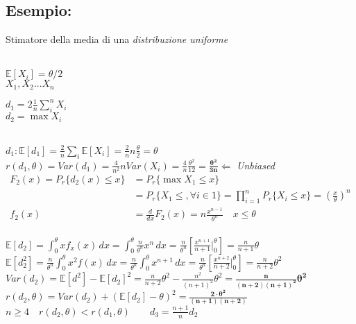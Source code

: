 \documentclass[]{article}
\newcommand{\ev}{\mathbb{E}[X]}
\renewcommand{\ev}[1]{\mathbb{E}[#1]}
\begin{document}
    \subsection{Esempio:} Stimatore della media di una \textit{distribuzione uniforme} \\\\
    \begin{minipage}{0.4\textwidth}
        $\ev{X_i} = \theta / 2$ \\
        $X_1, X_2 \ldots X_n$
    \end{minipage}
    \begin{minipage}{0.4\textwidth}
        $d_1 = 2 \frac{1}{n} \sum_{i}^{n} X_i$ \\
        $d_2 = \max X_i$
    \end{minipage} \\[4ex]
    $d_1 : \ev{d_1} = \frac{2}{n} \sum_{i}^{} \ev{X_i} = \frac{2}{n} n \frac{\theta}{2} = \theta$ \\
    $r(d_1, \theta) = Var(d_1) = \frac{4}{n^2} n Var(X_i) = \frac{4}{n} \frac{\theta^2}{12} = \boldsymbol{\frac{\theta^2}{3n}} \Leftarrow$ \textit{Unbiased} \\[4ex]
    \begin{equation*}
        \begin{split}
            F_2(x) = P_r \{ d_2(x) \leq x \} &= P_r \{ \max X_1 \leq x \} \\
            &= P_r \{ X_1 \leq, \forall i \in 1 \} = \prod_{i = 1}^{n} P_r \{ X_i \leq x \} = (\frac{x}{\theta})^n \\
            f_2(x) &= \frac{d}{dx} F_2(x) = n \frac{x^{n-1}}{\theta^n} \quad x \leq \theta
        \end{split}
    \end{equation*} \\[6ex]
    $\displaystyle \ev{d_2} = \int_{0}^{\theta} x f_x(x) \, dx = \int_{0}^{\theta} \frac{n}{\theta^n} x^n \, dx = \frac{n}{\theta^n} \left[ \frac{x^{n+1}}{n+1} \bigg\rvert_{0}^{\theta}\right] = \frac{n}{n+1} \theta$ \\[2ex]
    $\displaystyle \ev{d_2^2} = \frac{n}{\theta^n} \int_{0}^{\theta} x^2 f(x) \, dx = \frac{n}{\theta^n} \int_{0}^{\theta} x^{n+1} \, dx = \frac{n}{\theta^n} \left[ \frac{x^{n+2}}{n+2} \bigg\rvert_{0}^{\theta}\right] = \frac{n}{n+2} \theta^2$ \\[2ex]
    $Var(d_2) = \ev{d^2} - \ev{d_2}^2 = \frac{n}{n+2}\theta^2 - \frac{n^2}{(n+1)^2} \theta^2 = \boldsymbol{\frac{n}{(n+2)(n+1)^2} \theta^2}$ \\[4ex]
    $r(d_2, \theta) = Var(d_2) + (\ev{d_2} - \theta)^2 = \boldsymbol{\frac{2 \cdot \theta^2}{(n+1)(n+2)}}$ \\[4ex]
    $n \geq 4 \quad r(d_2, \theta) < r(d_1, \theta) \quad \quad d_3 = \frac{n+1}{n} d_2$
\end{document}
